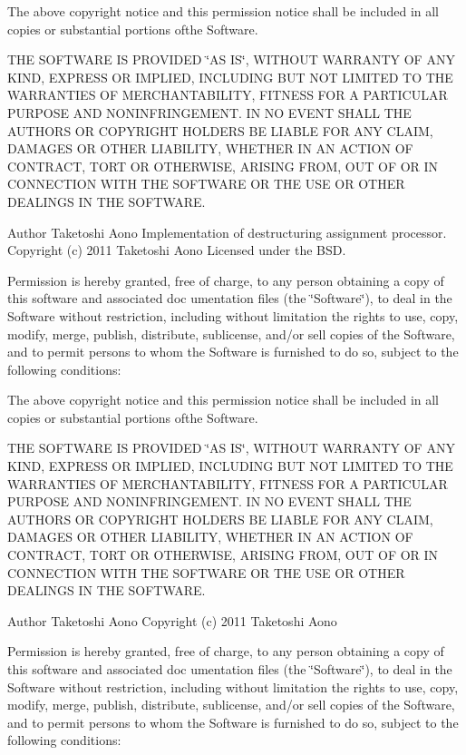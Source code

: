 The above copyright notice and this permission notice shall be included in all copies or substantial portions ofthe Software.

THE SOFTWARE IS PROVIDED \char`\"{}AS IS\char`\"{}, WITHOUT WARRANTY OF ANY KIND, EXPRESS OR IMPLIED, INCLUDING BUT NOT LIMITED TO THE WARRANTIES OF MERCHANTABILITY, FITNESS FOR A PARTICULAR PURPOSE AND NONINFRINGEMENT. IN NO EVENT SHALL THE AUTHORS OR COPYRIGHT HOLDERS BE LIABLE FOR ANY CLAIM, DAMAGES OR OTHER LIABILITY, WHETHER IN AN ACTION OF CONTRACT, TORT OR OTHERWISE, ARISING FROM, OUT OF OR IN CONNECTION WITH THE SOFTWARE OR THE USE OR OTHER DEALINGS IN THE SOFTWARE.

\begin{DoxyAuthor}{Author}
Taketoshi Aono  Implementation of destructuring assignment processor.  Copyright (c) 2011 Taketoshi Aono Licensed under the BSD.
\end{DoxyAuthor}
Permission is hereby granted, free of charge, to any person obtaining a copy of this software and associated doc umentation files (the \char`\"{}Software\char`\"{}), to deal in the Software without restriction, including without limitation the rights to use, copy, modify, merge, publish, distribute, sublicense, and/or sell copies of the Software, and to permit persons to whom the Software is furnished to do so, subject to the following conditions:

The above copyright notice and this permission notice shall be included in all copies or substantial portions ofthe Software.

THE SOFTWARE IS PROVIDED \char`\"{}AS IS\char`\"{}, WITHOUT WARRANTY OF ANY KIND, EXPRESS OR IMPLIED, INCLUDING BUT NOT LIMITED TO THE WARRANTIES OF MERCHANTABILITY, FITNESS FOR A PARTICULAR PURPOSE AND NONINFRINGEMENT. IN NO EVENT SHALL THE AUTHORS OR COPYRIGHT HOLDERS BE LIABLE FOR ANY CLAIM, DAMAGES OR OTHER LIABILITY, WHETHER IN AN ACTION OF CONTRACT, TORT OR OTHERWISE, ARISING FROM, OUT OF OR IN CONNECTION WITH THE SOFTWARE OR THE USE OR OTHER DEALINGS IN THE SOFTWARE.

\begin{DoxyAuthor}{Author}
Taketoshi Aono   Copyright (c) 2011 Taketoshi Aono
\end{DoxyAuthor}
Permission is hereby granted, free of charge, to any person obtaining a copy of this software and associated doc umentation files (the \char`\"{}Software\char`\"{}), to deal in the Software without restriction, including without limitation the rights to use, copy, modify, merge, publish, distribute, sublicense, and/or sell copies of the Software, and to permit persons to whom the Software is furnished to do so, subject to the following conditions:

